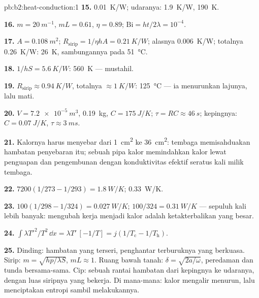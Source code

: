 \begin{solution}{pb:b2:heat-conduction:1}
\textbf{15.} \qty{0.01}{K/W}; udaranya: \qty{1.9}{K/W}, \qty{190}{K}.

\textbf{16.} $m = \qty{20}{m^{-1}}$, $mL = 0.61$, $\eta = 0.89$; $\mathrm{Bi} = ht/2\lambda
= 10^{-4}$.

\textbf{17.} $A = \qty{0.108}{m^2}$; $R_{\text{sirip}} = 1/\eta hA = \qty{0.21}{K/W}$; alasnya
\qty{0.006}{K/W}; totalnya \qty{0.26}{K/W}: \qty{26}{K}, sambungannya pada \qty{51}{\celsius}.

\textbf{18.} $1/hS = \qty{5.6}{K/W}$: \qty{560}{K} --- mustahil.

\textbf{19.} $R_{\text{sirip}} \approx \qty{0.94}{K/W}$, totalnya $\approx \qty{1}{K/W}$:
\qty{125}{\celsius} --- ia menurunkan lajunya, lalu mati.

\textbf{20.} $V = \qty{7.2e-5}{m^3}$, \qty{0.19}{kg}, $C = \qty{175}{J/K}$; $\tau = RC
\approx \qty{46}{s}$; kepingnya: $C = \qty{0.07}{J/K}$, $\tau \approx \qty{3}{ms}$.

\textbf{21.} Kalornya harus menyebar dari \qty{1}{cm^2} ke \qty{36}{cm^2}: tembaga
memisahduakan hambatan penyebaran itu; sebuah pipa kalor memindahkan kalor lewat
penguapan dan pengembunan dengan konduktivitas efektif seratus
kali milik tembaga.

\textbf{22.} $7200(1/273 - 1/293) = \qty{1.8}{W/K}$; \qty{0.33}{W/K}.

\textbf{23.} $100(1/298 - 1/324) = \qty{0.027}{W/K}$; $100/324 = \qty{0.31}{W/K}$ ---
sepuluh kali lebih banyak: mengubah kerja menjadi kalor adalah ketakterbalikan yang besar.

\textbf{24.} $\int\lambda T'^2/T^2\,\dd x = \lambda T'\,[-1/T] = j(1/T_{\text{c}} -
1/T_{\text{h}})$.

\textbf{25.} Dinding: hambatan yang terseri, penghantar terburuknya yang berkuasa.
Sirip: $m = \sqrt{hp/\lambda S}$, $mL \approx 1$. Ruang bawah tanah: $\delta = \sqrt{2a/\omega}$,
peredaman dan tunda bersama-sama. Cip: sebuah rantai hambatan dari kepingnya ke
udaranya, dengan luas siripnya yang bekerja. Di mana-mana: kalor mengalir menurun, lalu
menciptakan entropi sambil melakukannya.
\end{solution}
